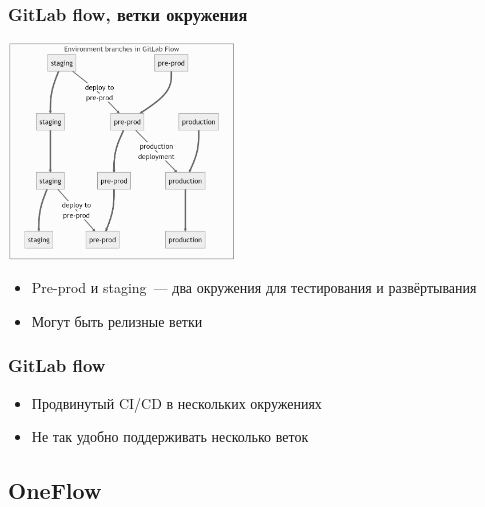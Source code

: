 \documentclass{../../slides-style}
\begin{document}
    \begin{frame}
        \frametitle{GitLab flow, ветки окружения}
        \begin{center}
            \includegraphics[width=0.45\textwidth]{gitlabFlow2.png}
        \end{center}
        \begin{itemize}
            \item Pre-prod и staging~--- два окружения для тестирования и развёртывания
            \item Могут быть релизные ветки
        \end{itemize}
    \end{frame}

    \begin{frame}
        \frametitle{GitLab flow}
        \begin{itemize}
            \item Продвинутый CI/CD в нескольких окружениях
            \item Не так удобно поддерживать несколько веток
        \end{itemize}
    \end{frame}

    \subsection{OneFlow}
\end{document}
